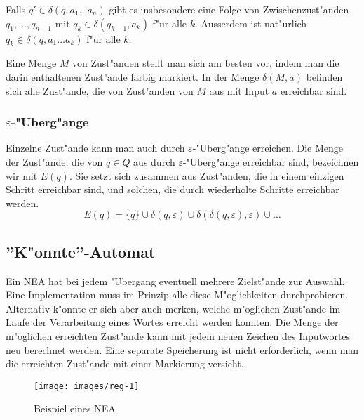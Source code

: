 Falls $q'\in\delta(q,a_1\dots a_n)$ gibt
es insbesondere eine Folge von Zwischenzust"anden $q_1,\dots,q_{n-1}$
mit $q_k\in\delta(q_{k-1},a_k)$ f"ur alle $k$. Ausserdem  ist
nat"urlich $q_k\in\delta(q,a_1\dots a_k)$ f"ur alle $k$.

Eine Menge $M$ von Zust"anden stellt man sich am besten vor, indem man die
darin enthaltenen Zust"ande farbig markiert. In der Menge $\delta(M,a)$
befinden sich alle Zust"ande, die von Zust"anden von $M$ aus mit Input
$a$ erreichbar sind.

\subsubsection{$\varepsilon$-"Uberg"ange}
Einzelne Zust"ande kann man auch durch $\varepsilon$-"Uberg"ange
erreichen. Die Menge der Zust"ande, die von $q\in Q$ aus durch
$\varepsilon$-"Uberg"ange erreichbar sind, bezeichnen wir mit
$E(q)$.
Sie setzt sich zusammen aus Zust"anden, die in einem einzigen 
Schritt erreichbar sind, und solchen, die durch wiederholte
Schritte erreichbar werden. 
\[
E(q)=\{q\} \cup \delta(q,\varepsilon) \cup \delta(\delta(q,\varepsilon),\varepsilon)\cup\dots
\]

\subsection{''K"onnte''-Automat\label{Thompson-NEA}}
Ein NEA hat bei jedem "Ubergang eventuell mehrere Zielst"ande zur Auswahl.
Eine Implementation muss im Prinzip alle diese M"oglichkeiten 
durchprobieren.
Alternativ k"onnte er sich aber auch merken,
welche m"oglichen Zust"ande im Laufe der Verarbeitung eines
Wortes erreicht werden konnten.
Die Menge der m"oglichen erreichten Zust"ande kann mit jedem
neuen Zeichen des Inputwortes neu berechnet werden. 
Eine separate Speicherung ist nicht erforderlich, wenn man die
erreichten Zust"ande mit einer Markierung versieht.

\begin{figure}[H]
\begin{center}
\texttt{[image: images/reg-1]}
\end{center}
\caption{Beispiel eines NEA\label{koenntenea}}
\end{figure}

